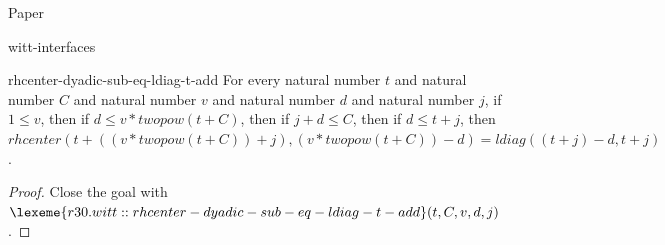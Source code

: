 \begin{lexlean}{Paper}
\begin{section}{witt-interfaces}
  \begin{theorem}{rhcenter-dyadic-sub-eq-ldiag-t-add}
  For every natural number \(t\) and natural number \(C\) and natural number \(v\) and natural number \(d\) and natural number \(j\), if \(1 ≤ v\), then if \(d ≤ v * twopow(t + C)\), then if \(j + d ≤ C\), then if \(d ≤ t + j\), then \(rhcenter(t + ((v * twopow(t + C)) + j), (v * twopow(t + C)) - d) = ldiag((t + j) - d, t + j)\).
  \begin{proof}
  Close the goal with \(\lexeme{r30.witt::rhcenter-dyadic-sub-eq-ldiag-t-add}(t, C, v, d, j)\).
  \end{proof}
  \end{theorem}

\end{section}
\end{lexlean}
